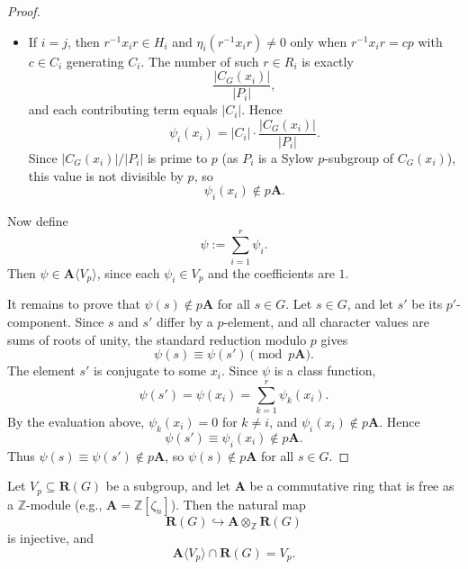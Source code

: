 \begin{proof}
\begin{itemize}
    \item If \(i = j\), then \(r^{-1} x_i r \in H_i\) and \(\eta_i(r^{-1} x_i r) \neq 0\) only when \(r^{-1} x_i r = c p\) with \(c \in C_i\) generating \(C_i\). The number of such \(r \in R_i\) is exactly
    \[
    \frac{|C_G(x_i)|}{|P_i|},
    \]
    and each contributing term equals \(|C_i|\). Hence
    \[
    \psi_i(x_i) = |C_i| \cdot \frac{|C_G(x_i)|}{|P_i|}.
    \]
    Since \(|C_G(x_i)|/|P_i|\) is prime to \(p\) (as \(P_i\) is a Sylow \(p\)-subgroup of \(C_G(x_i)\)), this value is not divisible by \(p\), so
    \[
    \psi_i(x_i) \notin p\mathbf{A}.
    \]
\end{itemize}

Now define
\[
\psi := \sum_{i=1}^r \psi_i.
\]
Then \(\psi \in \mathbf{A}\langle V_p \rangle\), since each \(\psi_i \in V_p\) and the coefficients are \(1\).

It remains to prove that \(\psi(s) \notin p\mathbf{A}\) for all \(s \in G\). Let \(s \in G\), and let \(s'\) be its \(p'\)-component. Since \(s\) and \(s'\) differ by a \(p\)-element, and all character values are sums of roots of unity, the standard reduction modulo \(p\) gives
\[
\psi(s) \equiv \psi(s') \pmod{p\mathbf{A}}.
\]
The element \(s'\) is conjugate to some \(x_i\). Since \(\psi\) is a class function,
\[
\psi(s') = \psi(x_i) = \sum_{k=1}^r \psi_k(x_i).
\]
By the evaluation above, \(\psi_k(x_i) = 0\) for \(k \neq i\), and \(\psi_i(x_i) \notin p\mathbf{A}\). Hence
\[
\psi(s') \equiv \psi_i(x_i) \notin p\mathbf{A}.
\]
Thus \(\psi(s) \equiv \psi(s') \notin p\mathbf{A}\), so \(\psi(s) \notin p\mathbf{A}\) for all \(s \in G\).
\end{proof}
\begin{lemma}
Let \(V_p \subseteq \mathbf{R}(G)\) be a subgroup, and let \(\mathbf{A}\) be a commutative ring that is free as a \(\mathbb{Z}\)-module (e.g., \(\mathbf{A} = \mathbb{Z}[\zeta_n]\)). Then the natural map
\[
\mathbf{R}(G) \hookrightarrow \mathbf{A} \otimes_{\mathbb{Z}} \mathbf{R}(G)
\]
is injective, and
\[
\mathbf{A}\langle V_p \rangle \cap \mathbf{R}(G) = V_p.
\]
\end{lemma}

